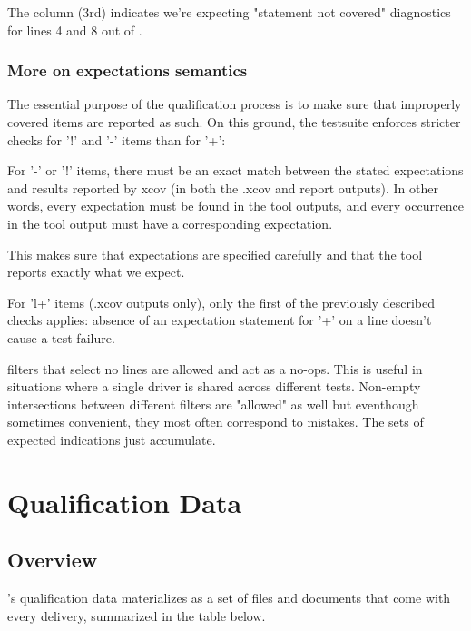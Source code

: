\documentclass {report}
\begin{document}
The  column (3rd) indicates we're expecting
"statement not covered" diagnostics for lines 4 and 8 out of .

\subsection {More on expectations semantics}

The essential purpose of the qualification process is to make sure that
improperly covered items are reported as such.
%
On this ground, the testsuite enforces stricter checks for '!' and '-' items
than for '+':

\begin{Itemize}
\item%
  For '-' or '!' items, there must be an exact match between the stated
  expectations and results reported by xcov (in both the .xcov and report
  outputs).
  In other words, every expectation must be found in the tool outputs, and
  every occurrence in the tool output must have a corresponding expectation.

  This makes sure that expectations are specified carefully and that the
  tool reports exactly what we expect.
%
\item%
  For 'l+' items (.xcov outputs only), only the first of the previously
  described checks applies: absence of an expectation statement for
  '+' on a line doesn't cause a test failure.
\end{Itemize}

 filters that select no lines are allowed and act as a
no-ops. This is useful in situations where a single driver is shared across
different tests.
%
Non-empty intersections between different filters are "allowed" as well but
eventhough sometimes convenient, they most often correspond to mistakes.
%
The sets of expected indications just accumulate.

\chapter{Qualification Data}

\section{Overview}
\label{sec:qd-overview}

\xcov{}'s qualification data materializes as a set of files and documents that
come with every delivery, summarized in the table below.
\end{document}
